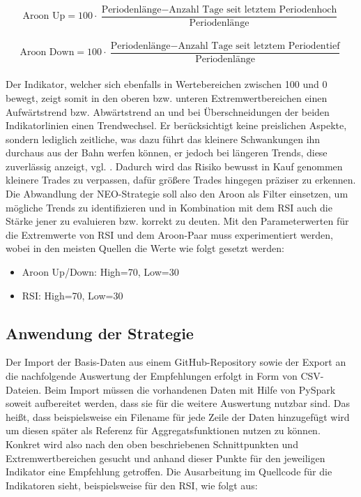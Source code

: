 \begin{equation}
\text{Aroon Up}=100\cdot\frac{\text{Periodenlänge}- \text{Anzahl Tage seit letztem Periodenhoch}}{\text{Periodenlänge}}
\end{equation} \\

\begin{equation}
\text{Aroon Down}=100\cdot\frac{\text{Periodenlänge}- \text{Anzahl Tage seit letztem Periodentief}}{\text{Periodenlänge}}
\end{equation} \\

Der Indikator, welcher sich ebenfalls in Wertebereichen zwischen 100 und 0 bewegt, zeigt somit in den oberen bzw. unteren Extremwertbereichen einen Aufwärtstrend bzw. Abwärtstrend an und bei Überschneidungen der beiden Indikatorlinien einen Trendwechsel. Er berücksichtigt keine preislichen Aspekte, sondern lediglich zeitliche, was dazu führt das kleinere Schwankungen ihn durchaus aus der Bahn werfen können, er jedoch bei längeren Trends, diese zuverlässig anzeigt, vgl. \cite{aro20}. Dadurch wird das Risiko bewusst in Kauf genommen kleinere Trades zu verpassen, dafür größere Trades hingegen präziser zu erkennen. Die Abwandlung der NEO-Strategie soll also den Aroon als Filter einsetzen, um mögliche Trends zu identifizieren und in Kombination mit dem RSI auch die Stärke jener zu evaluieren bzw. korrekt zu deuten. Mit den Parameterwerten für die Extremwerte von RSI und dem Aroon-Paar muss experimentiert werden, wobei in den meisten Quellen die Werte wie folgt gesetzt werden: \\

\begin{itemize}
	\item Aroon Up/Down: High=70, Low=30
	\item RSI: High=70, Low=30
\end{itemize}

\subsection{Anwendung der Strategie}

Der Import der Basis-Daten aus einem GitHub-Repository sowie der Export an die nachfolgende Auswertung der Empfehlungen erfolgt in Form von CSV-Dateien. Beim Import müssen die vorhandenen Daten mit Hilfe von PySpark soweit aufbereitet werden, dass sie für die weitere Auswertung nutzbar sind. Das heißt, dass beispielsweise ein Filename für jede Zeile der Daten hinzugefügt wird um diesen später als Referenz für Aggregatsfunktionen nutzen zu können. Konkret wird also nach den oben beschriebenen Schnittpunkten und Extremwertbereichen gesucht und anhand dieser Punkte für den jeweiligen Indikator eine Empfehlung getroffen. Die Ausarbeitung im Quellcode für die Indikatoren sieht, beispielsweise für den RSI, wie folgt aus: \\


